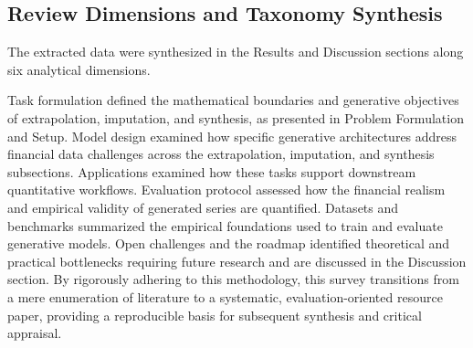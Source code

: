 \subsection{Review Dimensions and Taxonomy Synthesis}
The extracted data were synthesized in the Results and Discussion sections along six analytical dimensions.

Task formulation defined the mathematical boundaries and generative objectives of extrapolation, imputation, and synthesis, as presented in Problem Formulation and Setup. Model design examined how specific generative architectures address financial data challenges across the extrapolation, imputation, and synthesis subsections. Applications examined how these tasks support downstream quantitative workflows. Evaluation protocol assessed how the financial realism and empirical validity of generated series are quantified. Datasets and benchmarks summarized the empirical foundations used to train and evaluate generative models. Open challenges and the roadmap identified theoretical and practical bottlenecks requiring future research and are discussed in the Discussion section.
By rigorously adhering to this methodology, this survey transitions from a mere enumeration of literature to a systematic, evaluation-oriented resource paper, providing a reproducible basis for subsequent synthesis and critical appraisal.
